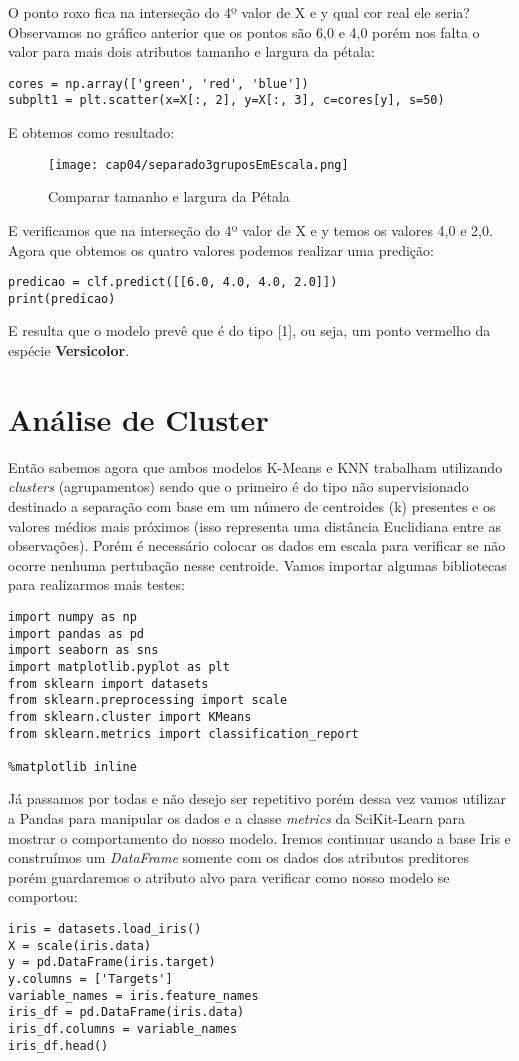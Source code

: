 O ponto roxo fica na interseção do 4º valor de X e y qual cor real ele seria? Observamos no gráfico anterior que os pontos são 6,0 e 4,0 porém nos falta o valor para mais dois atributos tamanho e largura da pétala:
\begin{lstlisting}[]
cores = np.array(['green', 'red', 'blue'])
subplt1 = plt.scatter(x=X[:, 2], y=X[:, 3], c=cores[y], s=50)
\end{lstlisting}

E obtemos como resultado:
\begin{figure}[H]
	\centering
	\texttt{[image: cap04/separado3gruposEmEscala.png]}
	\caption{Comparar tamanho e largura da Pétala}
\end{figure}

E verificamos que na interseção do 4º valor de X e y temos os valores 4,0 e 2,0. Agora que obtemos os quatro valores podemos realizar uma predição:
\begin{lstlisting}[]
predicao = clf.predict([[6.0, 4.0, 4.0, 2.0]])
print(predicao)
\end{lstlisting}

E resulta que o modelo prevê que é do tipo [1], ou seja, um ponto vermelho da espécie \textbf{Versicolor}. 

\section{Análise de Cluster}
Então sabemos agora que ambos modelos K-Means e KNN trabalham utilizando \textit{clusters} (agrupamentos) sendo que o primeiro é do tipo não supervisionado destinado a separação com base em um número de centroides (k) presentes e os valores médios mais próximos (isso representa uma distância Euclidiana entre as observações). Porém é necessário colocar os dados em escala para verificar se não ocorre nenhuma pertubação nesse centroide. Vamos importar algumas bibliotecas para realizarmos mais testes:
\begin{lstlisting}[]
import numpy as np
import pandas as pd
import seaborn as sns
import matplotlib.pyplot as plt
from sklearn import datasets
from sklearn.preprocessing import scale
from sklearn.cluster import KMeans
from sklearn.metrics import classification_report

%matplotlib inline
\end{lstlisting}

Já passamos por todas e não desejo ser repetitivo porém dessa vez vamos utilizar a Pandas para manipular os dados e a classe \textit{metrics} da SciKit-Learn para mostrar o comportamento do nosso modelo. Iremos continuar usando a base Iris e construímos um \textit{DataFrame} somente com os dados dos atributos preditores porém guardaremos o atributo alvo para verificar como nosso modelo se comportou:
\begin{lstlisting}[]
iris = datasets.load_iris()
X = scale(iris.data)
y = pd.DataFrame(iris.target)
y.columns = ['Targets']
variable_names = iris.feature_names
iris_df = pd.DataFrame(iris.data)
iris_df.columns = variable_names
iris_df.head()
\end{lstlisting}

